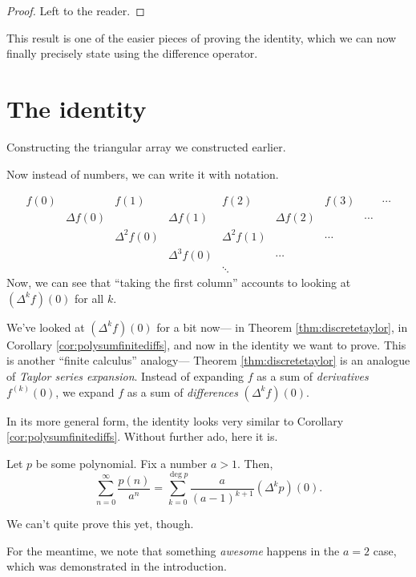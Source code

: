 \documentclass{article}
\DeclareMathOperator{\degree}{deg}
\begin{document}
\begin{proof}
    Left to the reader.
\end{proof}

This result is one of the easier pieces of proving the identity, which we can now finally precisely state using the difference operator.

\section{The identity}

Constructing the triangular array we constructed earlier.

Now instead of numbers, we can write it with notation.

\[
    \begin{matrix}
        f(0) && f(1) && f(2) && f(3) && \cdots \\
             &  \Delta f(0) && \Delta f(1) && \Delta f(2) && \cdots \\
             && \Delta^2 f(0) && \Delta^2 f(1) && \cdots \\
             && & \Delta^3 f(0) && \cdots \\
             &&&& \ddots
    \end{matrix}
\]
Now, we can see that ``taking the first column'' accounts to looking at $(\Delta^k f)(0)$ for all $k$. 

We've looked at $(\Delta^k f)(0)$ for a bit now--- in Theorem \ref{thm:discretetaylor}, in Corollary \ref{cor:polysumfinitediffs}, and now in the identity we want to prove. This is another ``finite calculus'' analogy--- Theorem \ref{thm:discretetaylor} is an analogue of \textit{Taylor series expansion}.
Instead of expanding $f$ as a sum of \textit{derivatives} $f^{(k)}(0)$, we expand $f$ as a sum of \textit{differences} $(\Delta^k f)(0)$.

In its more general form, the identity looks very similar to Corollary \ref{cor:polysumfinitediffs}.
Without further ado, here it is.

\begin{theorem}\label{thm:thethm}
    Let $p$ be some polynomial.
    Fix a number $a > 1$.
    Then,
    \[
        \sum_{n=0}^\infty \frac{p(n)}{a^n} = \sum_{k=0}^{\degree p} \frac{a}{(a-1)^{k+1}} (\Delta^k p)(0).
    \]
\end{theorem}

We can't quite prove this yet, though.

For the meantime, we note that something \textit{awesome} happens in the $a=2$ case, which was demonstrated in the introduction.
\end{document}
